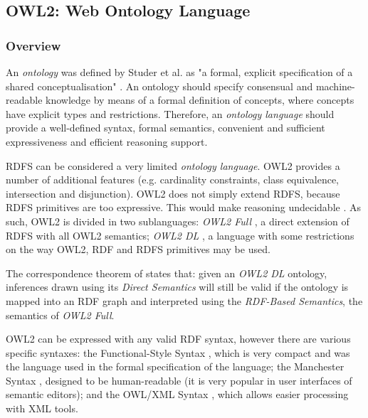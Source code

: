 \subsection{OWL2: Web Ontology Language}
\label{ch2:sec:semantic-web:owl}

\subsubsection{Overview}

An \emph{ontology} was defined by Studer et al. as "a formal, explicit specification of a shared conceptualisation" \autocite{Studer1998-kp}. An ontology should specify consensual and machine-readable knowledge by means of a formal definition of concepts, where concepts have explicit types and restrictions. Therefore, an \emph{ontology language} should provide a well-defined syntax, formal semantics, convenient and sufficient expressiveness and efficient reasoning support. 

\gls{RDFS} can be considered a very limited \emph{ontology language}. \gls{OWL2} \autocite{W3c_undated-dr} provides a number of additional features (e.g. cardinality constraints, class equivalence, intersection and disjunction). \gls{OWL2} does not simply extend \gls{RDFS}, because \gls{RDFS} primitives are too expressive. This would make reasoning undecidable \autocite{Antoniou2012-nj}. As such, \gls{OWL2} is divided in two sublanguages: \emph{OWL2 Full} \autocite{W3c_undated-ae}, a direct extension of \gls{RDFS} with all \gls{OWL2} semantics; \emph{OWL2 DL} \autocite{W3c_undated-xs}, a language with some restrictions on the way \gls{OWL2}, \gls{RDF} and \gls{RDFS} primitives may be used. 

The correspondence theorem of \autocite{W3c_undated-xs} states that: given an \emph{OWL2 DL} ontology, inferences drawn using its \emph{Direct Semantics} will still be valid if the ontology is mapped into an RDF graph and interpreted using the \emph{RDF-Based Semantics}, the semantics of \emph{OWL2 Full}.

\gls{OWL2} can be expressed with any valid \gls{RDF} syntax, however there are various specific syntaxes: the Functional-Style Syntax \autocite{W3c_undated-xm}, which is very compact and was the language used in the formal specification of the language; the Manchester Syntax \autocite{W3c_undated-dg}, designed to be human-readable (it is very popular in user interfaces of semantic editors); and the OWL/XML Syntax \autocite{W3c_undated-gr}, which allows easier processing with \gls{XML} tools.

